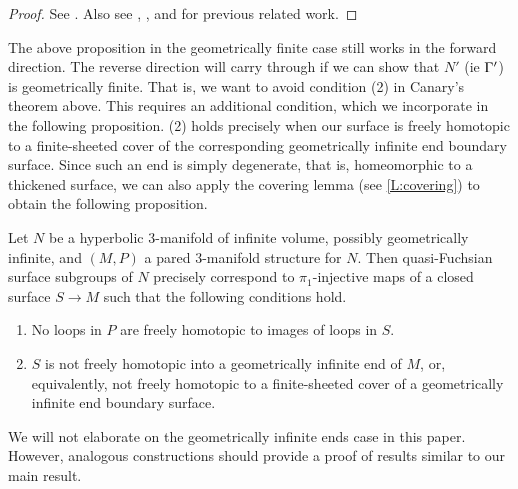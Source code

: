\begin{proof}

See \cite{Canary}. Also see \cite{Canary2}, \cite{Bonahon}, and
\cite{Thurstonnotes} for previous related work.

\end{proof}

The above proposition in the geometrically finite case still works in the
forward direction. The reverse direction will carry through if we can show that
$N'$ (ie $\Gamma'$) is geometrically finite. That is, we want to avoid condition
(2) in Canary's theorem above. This requires an additional condition, which we
incorporate in the following proposition. (2) holds precisely when our surface
is freely homotopic to a finite-sheeted cover of the corresponding
geometrically infinite end boundary surface. Since such an end is simply
degenerate, that is, homeomorphic to a thickened surface, we can also apply the
covering lemma (see \ref{L:covering}) to obtain the following proposition.

\begin{prop}

Let $N$ be a hyperbolic $3$-manifold of infinite volume, possibly geometrically
infinite, and $(M,P)$ a pared $3$-manifold structure for $N$. Then
quasi-Fuchsian surface subgroups of $N$ precisely correspond to
$\pi_1$-injective maps of a closed surface $S \to M$ such that the following
conditions hold.

\begin{enumerate}

\item No loops in $P$ are freely homotopic to images of loops in $S$.

\item $S$ is not freely homotopic into a geometrically infinite end of $M$, or,
equivalently, not freely homotopic to a finite-sheeted cover of a geometrically
infinite end boundary surface.

\end{enumerate}

\end{prop}

We will not elaborate on the geometrically infinite ends case in this paper.
However, analogous constructions should provide a proof of results similar to
our main result.

